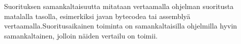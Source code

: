 \documentclass[finnish]{tktltiki2}
\theoremstyle{definition}
\theoremstyle{remark}
\begin{document}
\begin{itemize}
\begin{itemize}
Suorituksen samankaltaisuutta mitataan vertaamalla ohjelman suoritusta matalalla tasolla, esimerkiksi javan bytecodea tai assemblyä vertaamalla.Suoritusaikainen toiminta on samankaltaisilla ohjelmilla hyvin samankaltainen, jolloin näiden vertailu on toimii.
\end{itemize}



\end{itemize}




%
%
% 
%







%
\end{document}
